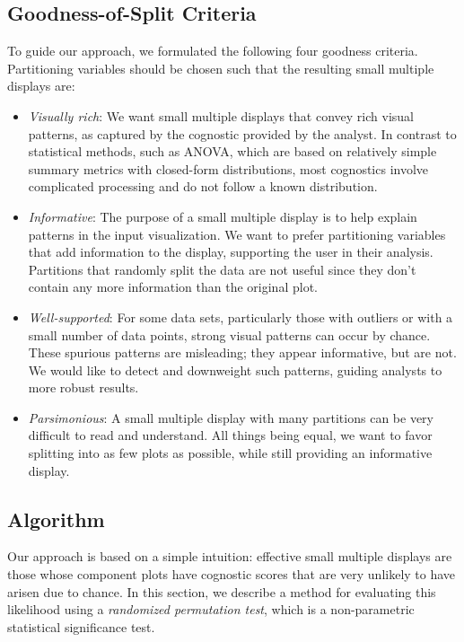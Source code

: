 \subsection{Goodness-of-Split Criteria}
To guide our approach, we formulated the following four goodness criteria. Partitioning variables should be chosen such that the resulting small multiple displays are:
\begin{itemize}
\item \emph{Visually rich}: We want small multiple displays that convey rich visual patterns, as captured by the cognostic provided by the analyst. In contrast to statistical methods, such as ANOVA, which are based on relatively simple summary metrics with closed-form distributions, most cognostics involve complicated processing and do not follow a known distribution.

\item \emph{Informative}: The purpose of a small multiple display is to help explain patterns in the input visualization. We want to prefer partitioning variables that add information to the display, supporting the user in their analysis. Partitions that randomly split the data are not useful since they don't contain any more information than the original plot.

\item \emph{Well-supported}: For some data sets, particularly those with outliers or with a small number of data points, strong visual patterns can occur by chance. These spurious patterns are misleading; they appear informative, but are not. We would like to detect and downweight such  patterns, guiding analysts to more robust results.

\item \emph{Parsimonious}: A small multiple display with many partitions can be very difficult to read and understand. All things being equal, we want to favor splitting into as few plots as possible, while still providing an informative display.
\end{itemize}

\subsection{Algorithm}

Our approach is based on a simple intuition: effective small multiple displays are those whose component plots have cognostic scores that are very unlikely to have arisen due to chance. In this section, we describe a method for evaluating this likelihood using a \emph{randomized permutation test}, which is a non-parametric statistical significance test.

